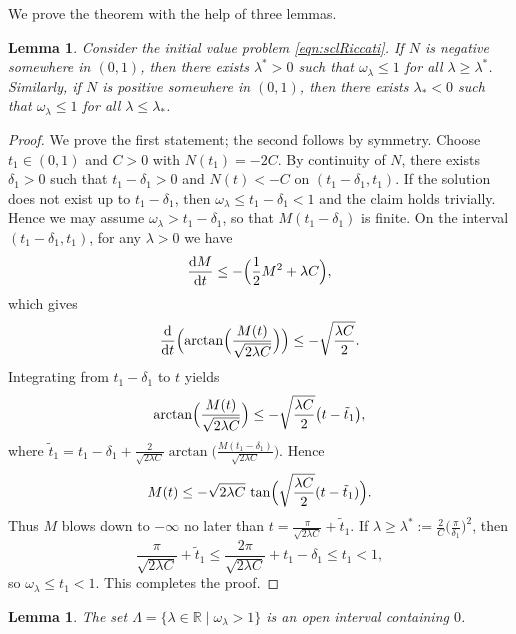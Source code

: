 \documentclass{amsart}
\newtheorem{lemma}[theorem]{Lemma}
\begin{document}
We prove the theorem with the help of three lemmas.

\begin{lemma}\label{lm:lm1}
Consider the initial value problem \eqref{eqn:sclRiccati}.
If $N$ is negative somewhere in $(0,1)$, then there exists $\lambda^{*}>0$ such that $\omega_{\lambda}\le 1$ for all $\lambda\ge\lambda^{*}$.
Similarly, if $N$ is positive somewhere in $(0,1)$, then there exists $\lambda_{*}<0$ such that $\omega_{\lambda}\le 1$ for all $\lambda\le\lambda_{*}$.
\end{lemma}

\begin{proof}
We prove the first statement; the second follows by symmetry.
Choose $t_{1}\in(0,1)$ and $C>0$ with $N(t_{1})=-2C$. By continuity of $N$, there exists $\delta_{1}>0$ such that $t_{1}-\delta_{1}>0$ and $N(t)<-C$ on $(t_{1}-\delta_{1},t_{1})$.
If the solution does not exist up to $t_{1}-\delta_{1}$, then $\omega_{\lambda}\le t_{1}-\delta_{1}<1$ and the claim holds trivially.
Hence we may assume $\omega_{\lambda}>t_{1}-\delta_{1}$, so that $M(t_{1}-\delta_{1})$ is finite. On the interval $(t_{1}-\delta_{1}, t_{1})$, for any $\lambda>0$ we have
\[
\frac{\mathrm{d}M}{\mathrm{d}t} \le -\Bigl(\frac{1}{2}M^{2}+\lambda C\Bigr),
\]
which gives
\[
\frac{\mathrm{d}}{\mathrm{d}t}\Bigl( \arctan \Bigl(\frac{M(t)}{\sqrt{2\lambda C}}\Bigr) \Bigr)
\le -\sqrt{\frac{\lambda C}{2}}.
\]
Integrating from $t_{1}-\delta_{1}$ to $t$ yields
\[
\arctan \Bigl(\frac{M(t)}{\sqrt{2\lambda C}}\Bigr)
\le -\sqrt{\frac{\lambda C}{2}}\bigl(t-\tilde{t}_{1}\bigr),
\]
where $\tilde{t}_{1} = t_{1}-\delta_{1}+\frac{2}{\sqrt{2\lambda C}}\arctan\bigl(\frac{M(t_{1}-\delta_{1})}{\sqrt{2\lambda C}}\bigr)$.
Hence
\[
M(t) \le -\sqrt{2\lambda C}\, \tan\Bigl(\sqrt{\frac{\lambda C}{2}}(t-\tilde{t}_{1})\Bigr).
\]
Thus $M$ blows down to $-\infty$ no later than $t = \frac{\pi}{\sqrt{2\lambda C}} + \tilde{t}_{1}$.
If $\lambda \ge \lambda^{*} := \frac{2}{C}\bigl(\frac{\pi}{\delta_{1}}\bigr)^{2}$, then
\[
\frac{\pi}{\sqrt{2\lambda C}} + \tilde{t}_{1} 
\le \frac{2\pi}{\sqrt{2\lambda C}} + t_{1} - \delta_{1} \le t_{1} < 1,
\]
so $\omega_{\lambda} \le t_{1} < 1$. This completes the proof.
\end{proof}

\begin{lemma}\label{lm:open}
The set $\Lambda = \{\lambda \in \mathbb{R} \mid \omega_{\lambda} > 1\}$ is an open interval containing $0$.
\end{lemma}
\end{document}
